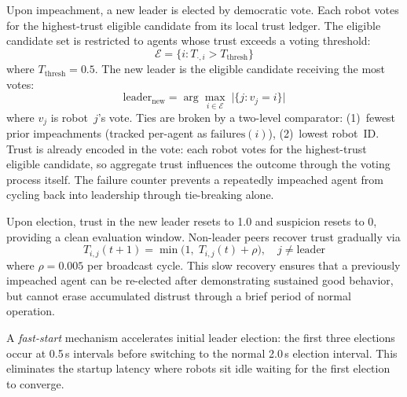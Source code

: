 \documentclass[conference]{IEEEtran}
\begin{document}
Upon impeachment, a new leader is elected by democratic vote. Each robot votes for the highest-trust eligible candidate from its local trust ledger. The eligible candidate set is restricted to agents whose trust exceeds a voting threshold:
\begin{equation}
    \mathcal{E} = \bigl\{i : T_{\cdot,i} > T_{\text{thresh}}\bigr\}
    \label{eq:eligible_set}
\end{equation}
where $T_{\text{thresh}} = 0.5$. The new leader is the eligible candidate receiving the most votes:
\begin{equation}
    \text{leader}_{\text{new}} = \arg\max_{i \in \mathcal{E}} \;
    \bigl|\{j : v_j = i\}\bigr|
    \label{eq:election}
\end{equation}
where $v_j$ is robot~$j$'s vote. Ties are broken by a two-level comparator: (1)~fewest prior impeachments (tracked per-agent as $\text{failures}(i)$), (2)~lowest robot~ID. Trust is already encoded in the vote: each robot votes for the highest-trust eligible candidate, so aggregate trust influences the outcome through the voting process itself. The failure counter prevents a repeatedly impeached agent from cycling back into leadership through tie-breaking alone.

Upon election, trust in the new leader resets to 1.0 and suspicion resets to 0, providing a clean evaluation window. Non-leader peers recover trust gradually via
\begin{equation}
    T_{i,j}(t{+}1) = \min\bigl(1,\; T_{i,j}(t) + \rho\bigr),
    \quad j \neq \text{leader}
    \label{eq:trust_recovery}
\end{equation}
where $\rho = 0.005$ per broadcast cycle. This slow recovery ensures that a previously impeached agent can be re-elected after demonstrating sustained good behavior, but cannot erase accumulated distrust through a brief period of normal operation.

A \emph{fast-start} mechanism accelerates initial leader election: the first three elections occur at 0.5\,s intervals before switching to the normal 2.0\,s election interval. This eliminates the startup latency where robots sit idle waiting for the first election to converge.
\end{document}
